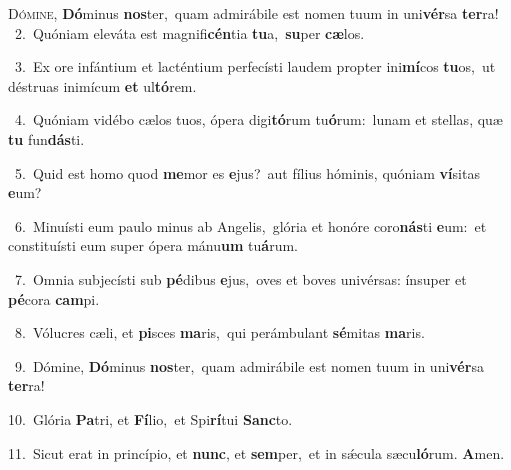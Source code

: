\lettrine{\initial\textcolor{\initialcolor}{D}}{ómine,} \textbf{Dó}\-minus \textbf{nos}\-ter,~\star quam admirábile est nomen tuum in uni\-\textbf{vér}\-sa \textbf{ter}\-ra!\\
{\numbfont\textcolor{\numbcolor}{~2.}}~Quóniam eleváta est magnifi\-\textbf{cén}\-tia \textbf{tu}\-a,~\star \textbf{su}\-per \textbf{cæ}\-los.\par
{\numbfont\textcolor{\numbcolor}{~3.}}~Ex ore infántium et lacténtium perfecísti laudem propter ini\-\textbf{mí}\-cos \textbf{tu}\-os,~\star ut déstruas inimícum \textbf{et} ul\-\textbf{tó}\-rem.\par
{\numbfont\textcolor{\numbcolor}{~4.}}~Quóniam vidébo cælos tuos, ópera digi\-\textbf{tó}\-rum tu\-\textbf{ó}\-rum:~\star lunam et stellas, quæ \textbf{tu} fun\-\textbf{dás}\-ti.\par
{\numbfont\textcolor{\numbcolor}{~5.}}~Quid est homo quod \textbf{me}\-mor es \textbf{e}\-jus?~\star aut fílius hóminis, quóniam \textbf{ví}\-sitas \textbf{e}\-um?\par
{\numbfont\textcolor{\numbcolor}{~6.}}~Minuísti eum paulo minus ab Angelis,~\dagger glória et honóre coro\-\textbf{nás}\-ti \textbf{e}\-um:~\star et constituísti eum super ópera mánu\textbf{um} tu\-\textbf{á}\-rum.\par
{\numbfont\textcolor{\numbcolor}{~7.}}~Omnia subjecísti sub \textbf{pé}\-dibus \textbf{e}\-jus,~\star oves et boves univérsas: ínsuper et \textbf{pé}\-cora \textbf{cam}\-pi.\par
{\numbfont\textcolor{\numbcolor}{~8.}}~Vólucres cæli, et \textbf{pi}\-sces \textbf{ma}\-ris,~\star qui perámbulant \textbf{sé}\-mitas \textbf{ma}\-ris.\par
{\numbfont\textcolor{\numbcolor}{~9.}}~Dómine, \textbf{Dó}\-minus \textbf{nos}\-ter,~\star quam admirábile est nomen tuum in uni\-\textbf{vér}\-sa \textbf{ter}\-ra!\par
{\numbfont\textcolor{\numbcolor}{10.}}~Glória \textbf{Pa}\-tri, et \textbf{Fí}\-lio,~\star et Spi\-\textbf{rí}\-tui \textbf{Sanc}\-to.\par
{\numbfont\textcolor{\numbcolor}{11.}}~Sicut erat in princípio, et \textbf{nunc}\-, et \textbf{sem}\-per,~\star et in sǽcula sæcu\-\textbf{ló}\-rum. \textbf{A}\-men.\par
